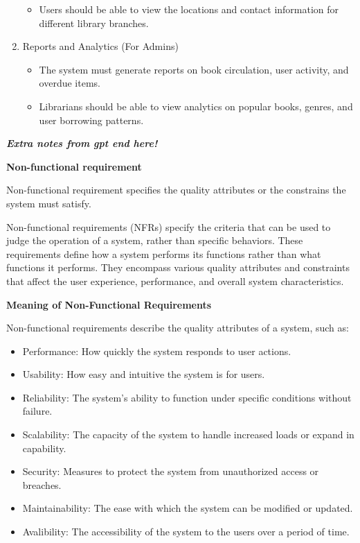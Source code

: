 \documentclass[a4paper]{article}
\begin{document}
\begin{enumerate}[(1)]
\begin{itemize}
                \item  Users should be able to view the locations and contact information for different library branches.
            \end{itemize}
        \item Reports and Analytics (For Admins)
            \begin{itemize}
                \item  The system must generate reports on book circulation, user activity, and overdue items.
                \item  Librarians should be able to view analytics on popular books, genres, and user borrowing patterns.
            \end{itemize}
    \end{enumerate}
\textbf{\textit{Extra notes from gpt end here! }}

\vspace{0.5 cm}
\begin{Large}\textbf{Non-functional requirement}\end{Large}

Non-functional requirement specifies the quality attributes or the constrains the system must satisfy.

Non-functional requirements (NFRs) specify the criteria that can be used to judge the operation of a system, rather than specific behaviors. 
These requirements define how a system performs its functions rather than what functions it performs. They encompass various quality attributes and 
constraints that affect the user experience, performance, and overall system characteristics.

\textbf {Meaning of Non-Functional Requirements}

Non-functional requirements describe the quality attributes of a system, such as:
\begin{itemize}
    \item Performance: How quickly the system responds to user actions.
    \item Usability: How easy and intuitive the system is for users.
    \item Reliability: The system's ability to function under specific conditions without failure.
    \item Scalability: The capacity of the system to handle increased loads or expand in capability.
    \item Security: Measures to protect the system from unauthorized access or breaches.
    \item Maintainability: The ease with which the system can be modified or updated.
    \item Avalibility: The accessibility of the system to the users over a period of time.
\end{itemize}
\end{document}
